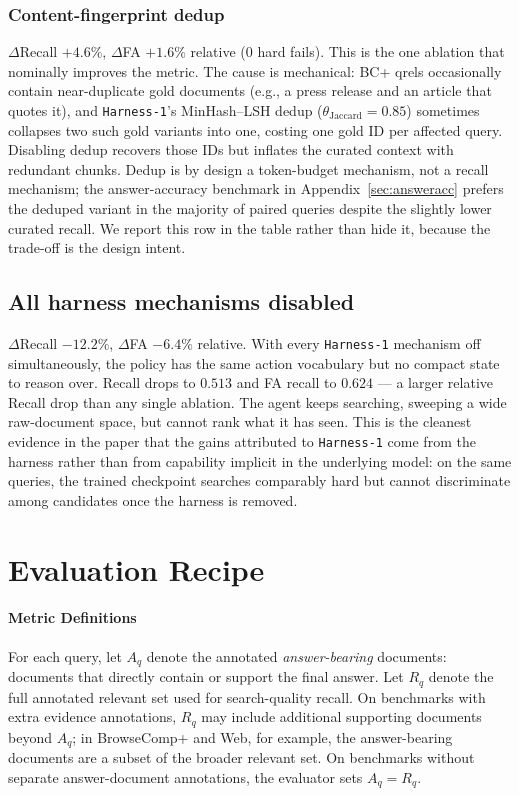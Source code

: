 \documentclass{article}
\newcommand{\sys}{\texttt{Harness-1}\xspace}
\begin{document}
\subsubsection{Content-fingerprint dedup}
\label{app:err:content-dedup}
$\Delta$Recall $+4.6\%$, $\Delta$FA $+1.6\%$ relative
($0$ hard fails).
This is the one ablation that nominally improves the metric.
The cause is mechanical: BC+ qrels occasionally contain
near-duplicate gold documents (e.g., a press release and an
article that quotes it), and \sys's MinHash--LSH dedup
($\theta_{\text{Jaccard}}{=}0.85$) sometimes collapses two such
gold variants into one, costing one gold ID per affected query.
Disabling dedup recovers those IDs but inflates the curated
context with redundant chunks. Dedup is by design a
token-budget mechanism, not a recall mechanism; the
answer-accuracy benchmark in Appendix~\ref{sec:answeracc}
prefers the deduped variant in the majority of paired queries
despite the slightly lower curated recall. We report this row
in the table rather than hide it, because the trade-off is the
design intent.

\subsection{All harness mechanisms disabled}
\label{app:err:all-disabled}
$\Delta$Recall $-12.2\%$, $\Delta$FA $-6.4\%$ relative.
With every \sys
mechanism off simultaneously, the policy has the same action
vocabulary but no compact state to reason over. Recall drops to
$0.513$ and FA recall to $0.624$ --- a larger relative Recall
drop than any single ablation. The agent keeps searching,
sweeping a wide
raw-document space, but cannot rank what it has seen. This is
the cleanest evidence in the paper that the gains attributed to
\sys come from the harness rather than from capability implicit
in the underlying model: on the same queries, the trained
checkpoint searches comparably hard but cannot discriminate
among candidates once the harness is removed.

\section{Evaluation Recipe}
\label{app:eval-recipe}

\paragraph{Metric Definitions}
\label{app:metric-defs}
For each query, let $A_q$ denote the annotated \emph{answer-bearing}
documents: documents that directly contain or support the final answer. Let
$R_q$ denote the full annotated relevant set used for search-quality recall.
On benchmarks with extra evidence annotations, $R_q$ may include additional
supporting documents beyond $A_q$; in BrowseComp+ and Web, for example,
the answer-bearing documents are a subset of the broader relevant set. On
benchmarks without separate answer-document annotations, the evaluator sets
$A_q=R_q$.
\end{document}
